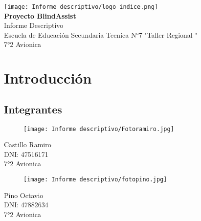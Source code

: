 \documentclass[12pt,a4paper]{article}
\begin{document}
\begin{titlepage}
    \begin{center}
    
    \vspace*{2cm}
    \texttt{[image: Informe descriptivo/logo indice.png]}\\[2cm] %

    {\Huge\bfseries Proyecto BlindAssist \\[0.5cm]}
    {\Large Informe Descriptivo}\\[1.5cm]


    {\large Escuela de Educación Secundaria Tecnica N°7 "Taller Regional "}\\
    {\large 7°2 Avionica}

    \vfill
    \end{center}
\end{titlepage}

\setcounter{page}{1}
\setcounter{tocdepth}{4} %
\setcounter{secnumdepth}{4}
\tableofcontents
\newpage

\section{Introducción}

\subsection{Integrantes}
\begin{figure}[H]
    \centering
    \texttt{[image: Informe descriptivo/Fotoramiro.jpg]}
\end{figure}
\begin{center}
Castillo Ramiro\\
DNI: 47516171\\
7°2 Avionica
\end{center}

\begin{figure}[H]
    \centering
    \texttt{[image: Informe descriptivo/fotopino.jpg]}
\end{figure}
\begin{center}

Pino Octavio\\
DNI: 47882634\\
7°2 Avionica
\end{center}
\end{document}
